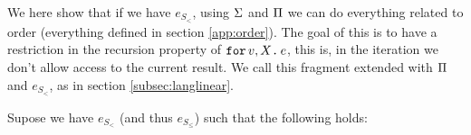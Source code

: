 
We here show that if we have $e_{S_{<}}$, using $\Sigma$ and $\Pi$ we
can do everything related to order (everything defined in section \ref{app:order}).
The goal of this is to have a restriction in the recursion property of $\texttt{for}\, v,X \texttt{.}\, e$, this is, 
in the iteration we don't allow access to the current result.
We call this fragment \langsum extended with $\Pi$ and $e_{S_<}$, as in section \ref{subsec:langlinear}.

Supose we have $e_{S_{<}}$ (and thus $e_{S_{\leq}}$) such that the following holds:

